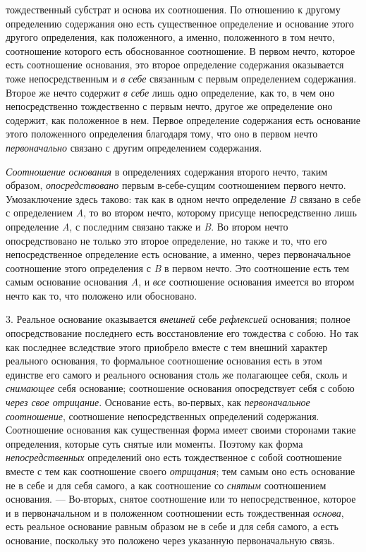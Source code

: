тождественный субстрат и основа их соотношения. По отношению к другому
определению содержания оно есть существенное определение и основание этого
другого определения, как положенного, а именно, положенного в том нечто,
соотношение которого есть обоснованное соотношение. В первом нечто, которое
есть соотношение основания, это второе определение содержания оказывается
тоже непосредственным и {\em в себе} связанным с первым
определением содержания. Второе же нечто содержит
{\em в себе} лишь одно определение, как то, в чем оно
непосредственно тождественно с первым нечто, другое же определение оно
содержит, как положенное в нем. Первое определение содержания есть
основание этого положенного определения благодаря тому, что оно в первом
нечто {\em первоначально} связано с другим определением
содержания.

{\em Соотношение основания} в определениях содержания
второго нечто, таким образом, {\em опосредствовано}
первым в-себе-сущим соотношением первого нечто. Умозаключение здесь таково:
так как в одном нечто определение {\em B} связано в
себе с определением {\em A}, то во втором нечто,
которому присуще непосредственно лишь определение
{\em A}, с последним связано также и
{\em B}. Во втором нечто опосредствовано не только это
второе определение, но также и то, что его непосредственное определение
есть основание, а именно, через первоначальное соотношение этого
определения с {\em B} в первом нечто. Это соотношение
есть тем самым основание основания {\em A}, и
{\em все} соотношение основания имеется во втором нечто
как то, что положено или обосновано.

3. Реальное основание оказывается {\em внешней} себе
{\em рефлексией} основания; полное опосредствование
последнего есть восстановление его тождества с собою. Но так как последнее
вследствие этого приобрело вместе с тем внешний характер реального
основания, то формальное соотношение основания есть в этом единстве его
самого и реального основания столь же полагающее себя, сколь и
{\em снимающее} себя основание; соотношение основания
опосредствует себя с собою {\em через свое отрицание}.
Основание есть, во-первых, как {\em первоначальное
}{\em соотношение}, соотношение непосредственных
определений содержания. Соотношение основания как существенная форма имеет
своими сторонами такие определения, которые суть снятые или моменты.
Поэтому как форма {\em непосредственных} определений
оно есть тождественное с собой соотношение вместе с тем как соотношение
своего {\em отрицания}; тем самым оно есть основание не
в себе и для себя самого, а как соотношение со
{\em снятым} соотношением основания. — Во-вторых,
снятое соотношение или то непосредственное, которое и в первоначальном и в
положенном соотношении есть тождественная {\em основа},
есть реальное основание равным образом не в себе и для себя самого, а есть
основание, поскольку это положено через указанную первоначальную связь.

